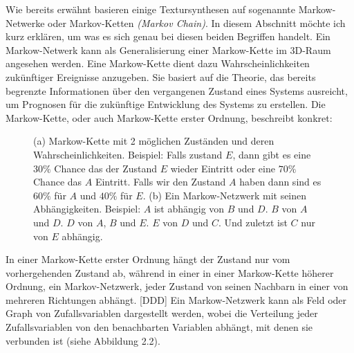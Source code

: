 \documentclass[12pt, a4paper,twoside,openright]{report}
\begin{document}
Wie bereits erwähnt basieren einige Textursynthesen auf sogenannte Markow-Netwerke oder Markov-Ketten \textit{(Markov Chain)}.
In diesem Abschnitt möchte ich kurz erklären, um was es sich genau bei diesen beiden Begriffen handelt.
Ein Markow-Netwerk kann als Generalisierung einer Markow-Kette im 3D-Raum angesehen werden.
Eine Markow-Kette dient dazu Wahrscheinlichkeiten zukünftiger Ereignisse anzugeben.
Sie basiert auf die Theorie, das bereits begrenzte Informationen über den vergangenen Zustand eines Systems ausreicht,
um Prognosen für die zukünftige Entwicklung des Systems zu erstellen.
Die Markow-Kette, oder auch Markow-Kette erster Ordnung, beschreibt konkret:

\begin{figure}[H]
    \centering
    \qquad
    \caption{(a) Markow-Kette mit 2 möglichen Zuständen und deren Wahrscheinlichkeiten.
    Beispiel: Falls zustand $E$, dann gibt es eine $30\%$ Chance das der Zustand $E$ wieder Eintritt oder eine $70\%$ Chance das $A$ Eintritt.
    Falls wir den Zustand $A$ haben dann sind es $60\%$ für $A$ und $40\%$ für $E$. (b) Ein Markow-Netzwerk mit seinen Abhängigkeiten.
    Beispiel: $A$ ist abhängig von $B$ und $D$. $B$ von $A$ und $D$. $D$ von $A$, $B$ und $E$. $E$ von $D$ und $C$. Und zuletzt ist $C$ nur von $E$ abhängig.}%
\end{figure}

In einer Markow-Kette erster Ordnung hängt der Zustand nur vom vorhergehenden Zustand ab,
während in einer in einer Markow-Kette höherer Ordnung, ein Markov-Netzwerk, jeder Zustand von seinen Nachbarn in einer von mehreren Richtungen abhängt. {[DDD]}
Ein Markow-Netzwerk kann als Feld oder Graph von Zufallsvariablen dargestellt werden,
wobei die Verteilung jeder Zufallsvariablen von den benachbarten Variablen abhängt, mit denen sie verbunden ist {(siehe Abbildung 2.2)}.
\end{document}
